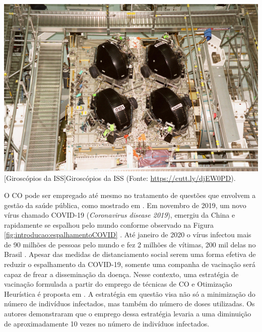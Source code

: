 \noindent	
\begin{minipage}{\textwidth}
	\vspace{\onelineskip}
	\centering
	\includegraphics[width=0.8\linewidth]{fig/introducao/giroscopiosISS}
	[Giroscópios da ISS]{Giroscópios da ISS (Fonte: \url{https://cutt.ly/djEW0PD}).}
	\label{fig:introducao:giroscopios}
	\vspace{\onelineskip}
\end{minipage}

O CO pode ser empregado até mesmo no tratamento de questões que envolvem a gestão da saúde pública, como mostrado em . Em novembro de 2019, um novo vírus chamado COVID-19 (\textit{Coronavirus disease 2019}), emergiu da China e rapidamente se espalhou pelo mundo conforme observado na Figura \ref{fig:introducao:espalhamentoCOVID} \cite{libotte_determination_2020}. Até janeiro de 2020 o vírus infectou mais de 90 milhões de pessoas pelo mundo e fez 2 milhões de vítimas, 200 mil delas no Brasil \cite{dong_interactive_2020}. Apesar das medidas de distanciamento social serem uma forma efetiva de reduzir o espalhamento da COVID-19, somente uma companha de vacinação será capaz de frear a disseminação da doença. Nesse contexto, uma estratégia de vacinação formulada a partir do emprego de técnicas de CO e Otimização Heurística é proposta em . A estratégia em questão visa não só a minimização do número de indivíduos infectados, mas também do número de doses utilizadas. Os autores demonstraram que o  emprego dessa estratégia levaria a uma diminuição de aproximadamente 10 vezes no número de indivíduos infectados.

